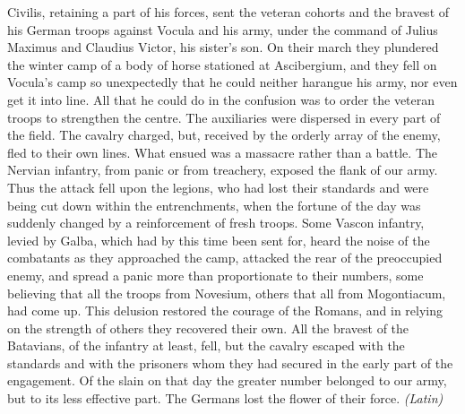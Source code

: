 Civilis, retaining a part of his forces, sent the veteran cohorts and the bravest of his German troops against Vocula and his army, under the command of Julius Maximus and Claudius Victor, his sister's son. On their march they plundered the winter camp of a body of horse stationed at Ascibergium, and they fell on Vocula's camp so unexpectedly that he could neither harangue his army, nor even get it into line. All that he could do in the confusion was to order the veteran troops to strengthen the centre. The auxiliaries were dispersed in every part of the field. The cavalry charged, but, received by the orderly array of the enemy, fled to their own lines. What ensued was a massacre rather than a battle. The Nervian infantry, from panic or from treachery, exposed the flank of our army. Thus the attack fell upon the legions, who had lost their standards and were being cut down within the entrenchments, when the fortune of the day was suddenly changed by a reinforcement of fresh troops. Some Vascon infantry, levied by Galba, which had by this time been sent for, heard the noise of the combatants as they approached the camp, attacked the rear of the preoccupied enemy, and spread a panic more than proportionate to their numbers, some believing that all the troops from Novesium, others that all from Mogontiacum, had come up. This delusion restored the courage of the Romans, and in relying on the strength of others they recovered their own. All the bravest of the Batavians, of the infantry at least, fell, but the cavalry escaped with the standards and with the prisoners whom they had secured in the early part of the engagement. Of the slain on that day the greater number belonged to our army, but to its less effective part. The Germans lost the flower of their force. \emph{(Latin)}


